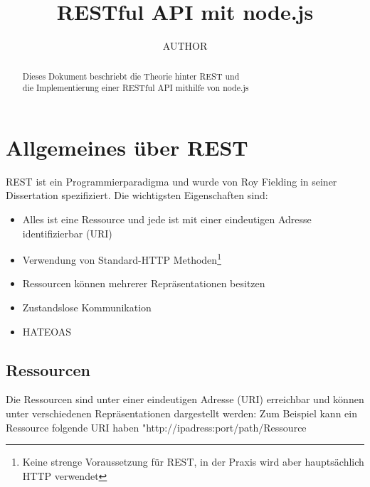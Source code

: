 \documentclass[]{article}
\title{RESTful API mit node.js}
\author{AUTHOR}
\begin{document}
	\maketitle
	\begin{abstract}
		\begin{center}
			Dieses Dokument beschriebt die Theorie hinter \ac{REST} und \\
			die Implementierung einer RESTful \ac{API} mithilfe von node.js
		\end{center}
	\end{abstract}
	\newpage
	
	\tableofcontents 
	\newpage
	
	\section{Allgemeines über \ac{REST}}
	\ac{REST} ist ein Programmierparadigma und wurde von Roy Fielding in seiner Dissertation\cite{REST_THESIS} spezifiziert.
	\newline \newline
	Die wichtigsten Eigenschaften\cite[p.~2]{RESTBOOK} sind:
	\begin{itemize}  
		\item Alles ist eine Ressource und jede ist mit einer eindeutigen Adresse identifizierbar (\ac{URI})
		\item Verwendung von Standard-\ac{HTTP} Methoden\footnote{Keine strenge Voraussetzung für \ac{REST}, in der Praxis wird aber hauptsächlich \ac{HTTP} verwendet}
		\item Ressourcen können mehrerer Repräsentationen besitzen
		\item Zustandslose Kommunikation
		\item  \ac{HATEOAS}
	\end{itemize}
	\subsection{Ressourcen}
	Die Ressourcen sind unter einer eindeutigen Adresse (\ac{URI}) erreichbar und können unter verschiedenen Repräsentationen dargestellt werden:
	\newline \newline
	Zum Beispiel kann ein Ressource folgende \ac{URI} haben "http://ipadress:port/path/Ressource
\end{document}
